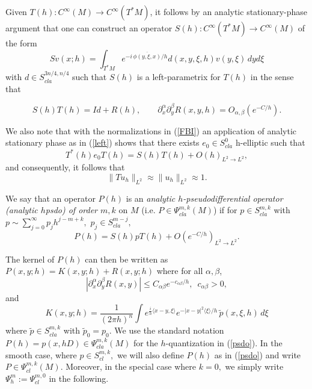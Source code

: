 \documentclass[11pt,reqno]{amsart}
\theoremstyle{definition}
\begin{document}
Given $T(h) :C^{\infty}(M) \to C^{\infty}(T^*M)$, it follows by an analytic stationary-phase argument \cite{S82} that one can construct an operator $S(h): C^{\infty}(T^*M) \to C^{\infty}(M)$ of the form
\begin{equation} \label{left}
 S v(x;h) = \int_{T^*M} e^{-i  \, \overline{\phi(y,\xi,x)}  /h} d(x,y,\xi,h) v(y,\xi) \, dy d\xi \end{equation}
with $d \in S^{3n/4,n/4}_{cla}$ such that $S(h)$  is a left-parametrix for $T(h)$ in the sense that

\begin{equation} \label{leftparametrix}
S(h) T(h) = Id + R(h),\qquad\partial_{x}^{\alpha} \partial_{y}^{\beta} R(x,y,h) = O_{\alpha, \beta}(e^{-C/h}).
\end{equation}

We also note that with the normalizations in (\ref{FBI}) an application of analytic stationary phase as in (\ref{left}) shows that there exists $e_0 \in S^{0}_{cla}$  h-elliptic such that 
$$ T^*(h) e_0 T(h) = S(h)  T(h) +O(h)_{L^2 \to L^2},$$
and consequently, it follows that
$$ \| T u_h \|_{L^2}  \approx \| u_h \|_{L^2} \approx 1.$$

We say that an operator $P(h)$ is an \emph{analytic $h$-pseudodifferential operator (analytic $h$psdo) of order $m,k$} on $M$ (i.e. $ P \in \Psi^{m,k}_{cla}(M)$) if for
 $p \in S^{m,k}_{cla}$ with $p \sim \sum_{j=0}^\infty p_j h^{j-m+k},$  $p_j \in S^{m-j}_{cla},$
 \begin{equation} \label{psdo}
 P(h) = S(h) p T(h) +O(e^{-C/h})_{L^2 \to L^2}. \end{equation}
 
  The kernel of $P(h)$ can then be written as $P(x,y;h)=K(x,y;h)+R(x,y;h)$ where for all $\alpha,\beta$,
$$|\partial_x^\alpha \partial_y^\beta R(x,y)|\leq C_{\alpha\beta} e^{-c_{\alpha\beta}/h}, \,\,\, c_{\alpha \beta} >0,$$
and
\begin{equation}
K(x,y;h)=\frac{1}{(2\pi h)^n}\int e^{\frac{i}{h}\langle x-y,\xi \rangle} e^{-|x-y|^2 \langle \xi \rangle /h} \,  \tilde{p}(x,\xi,h) \,d\xi
\end{equation}
where  $\tilde p \in S^{m,k}_{cla}$ with $\tilde{p}_0 = p_0.$  We use the standard notation $P(h)= p(x,hD) \in \Psi^{m,k}_{cla}(M)$ for the $h$-quantization in (\ref{psdo}). 
In the smooth case, where $p \in S^{m,k}_{cl},$ we will also define $P(h)$ as in (\ref{psdo}) and write $P \in \Psi^{m,k}_{cl}(M).$ Moreover, in the special case where $k=0,$ we simply write $\Psi^{m}_{h}:= \Psi^{m,0}_{cl}$ in the following.
\end{document}
